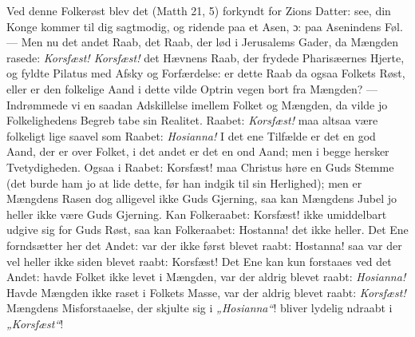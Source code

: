 \documentclass[12pt,a4paper]{book}
\begin{document}
Ved denne Folkerøst blev det (Matth 21, 5) {\large forkyndt for Zions Datter: see, din
Konge kommer til dig sagtmodig, og ridende paa et Asen, ɔ: paa Asenindens
Føl.} --- Men nu det andet Raab, det Raab, der lød i Jerusalems Gader, da Mængden
rasede: \emph{Korsfæst! Korsfæst!} det Hævnens Raab, der frydede Pharisæernes Hjerte, og
fyldte Pilatus med Afsky og Forfærdelse: er dette Raab da ogsaa Folkets Røst, eller er
den folkelige Aand i dette vilde Optrin vegen bort fra Mængden? --- Indrømmede vi en
saadan Adskillelse imellem Folket og Mængden, da vilde jo Folkelighedens Begreb tabe sin
Realitet. Raabet: \emph{Korsfæst!} maa altsaa være folkeligt lige saavel som Raabet:
\emph{Hosianna!} I det ene Tilfælde er det en god Aand, der er over Folket, i det andet
er det en ond Aand; men i begge hersker Tvetydigheden. Ogsaa i Raabet: Korsfæst! maa
Christus høre en Guds Stemme (det burde ham jo at lide dette, før han indgik til sin
Herlighed); men er Mængdens Rasen dog alligevel ikke Guds Gjerning, saa kan Mængdens
Jubel jo heller ikke være Guds Gjerning. Kan Folkeraabet: Korsfæst! ikke umiddelbart
udgive sig for Guds Røst, saa kan Folkeraabet: Hostanna! det ikke heller. Det Ene
forndsætter her det Andet: var der ikke først blevet raabt: Hostanna! saa var der vel
heller ikke siden blevet raabt: Korsfæst! Det Ene kan kun forstaaes ved det Andet: havde
Folket ikke levet i Mængden, var der aldrig blevet raabt: \emph{Hosianna!} Havde
Mængden ikke raset i Folkets Masse, var der aldrig blevet raabt: \emph{Korsfæst!}
Mængdens Misforstaaelse, der skjulte sig i \emph{„Hosianna“}! bliver lydelig ndraabt i
\emph{„Korsfæst“}!
\end{document}
